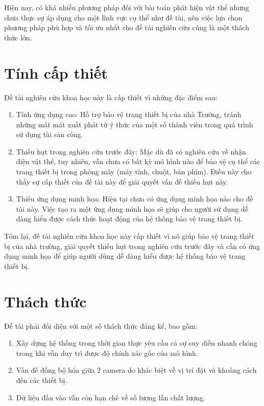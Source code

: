	Hiện nay, có khá nhiều phương pháp đối với bài toán phát hiện vật thể nhưng chưa thực sự áp dụng cho một lĩnh vực cụ thể như đề tài, nên việc lựa chọn phương pháp phù hợp và tối ưu nhất cho đề tài nghiên cứu cũng là một thách thức lớn.


\section{Tính cấp thiết}
Đề tài nghiên cứu khoa học này là cấp thiết vì những đặc điểm sau:
\begin{enumerate}
	\itemsep0em 
	\item Tính ứng dụng cao: Hỗ trợ bảo vệ trang thiết bị của nhà Trường, tránh những mất mát xuất phát từ ý thức của một số thành viên trong quá trình sử dụng tài sản công.
	\item Thiếu hụt trong nghiên cứu trước đây: Mặc dù đã có nghiên cứu về nhận diện vật thể, tuy nhiên, vẫn chưa có bất kỳ mô hình nào để bảo vệ cụ thể các trang thiết bị trong phòng máy (máy tính, chuột, bàn phím). Điều này cho thấy sự cấp thiết của đề tài này để giải quyết vấn đề thiếu hụt này.
	\item Thiếu ứng dụng minh họa: Hiện tại chưa có ứng dụng minh họa nào cho đề tài này. Việc tạo ra một ứng dụng minh họa sẽ giúp cho người sử dụng dễ dàng hiểu được cách thức hoạt động của hệ thống bảo vệ trang thiết bị.
\end{enumerate}

Tóm lại, đề tài nghiên cứu khoa học này cấp thiết vì nó giúp bảo vệ trang thiết bị của nhà trường, giải quyết thiếu hụt trong nghiên cứu trước đây và cần có ứng dụng minh họa để giúp người dùng dễ dàng hiểu được hệ thống bảo vệ trang thiết bị.


\section{Thách thức}
Đề tài phải đối diện với một số thách thức đáng kể, bao gồm:

\begin{enumerate}
	\itemsep0em 
	\item Xây dựng hệ thống trong thời gian thực yêu cầu cả sự suy diễn nhanh chóng trong khi vẫn duy trì được độ chính xác gốc của mô hình.
	\item Vấn đề đồng bộ hóa giữa 2 camera do khác biệt về vị trí đặt và khoảng cách đến các thiết bị.
	\item Dữ liệu đầu vào vẫn còn hạn chế về số lượng lẫn chất lượng.
\end{enumerate}


